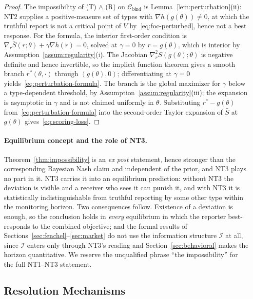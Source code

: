 \documentclass[acmsmall,nonacm,screen]{acmart}
\theoremstyle{acmplain}%
\theoremstyle{acmdefinition}%
\newcommand{\calI}{\mathcal{I}}
\newcommand{\Cbind}{\mathcal{C}_{\mathrm{bind}}}
\newcommand{\Sbar}{\bar{S}}
\numberwithin{equation}{section}
\begin{document}
\begin{proof}
The impossibility of (T) $\wedge$ (R) on $\Cbind$ is Lemma~\ref{lem:perturbation}(ii): NT2 supplies a positive-measure set of types with $\nabla h(g(\theta)) \neq 0$, at which the truthful report is not a critical point of $V$ by~\eqref{eq:foc-perturbed}, hence not a best response. For the formula, the interior first-order condition is $\nabla_r \Sbar(r;\theta) + \gamma \nabla h(r) = 0$, solved at $\gamma = 0$ by $r = g(\theta)$, which is interior by Assumption~\ref{assum:regularity}(i). The Jacobian $\nabla^2_r \Sbar(g(\theta);\theta)$ is negative definite and hence invertible, so the implicit function theorem gives a smooth branch $r^*(\theta,\cdot)$ through $(g(\theta),0)$; differentiating at $\gamma = 0$ yields~\eqref{eq:perturbation-formula}. The branch is the global maximizer for $\gamma$ below a type-dependent threshold, by Assumption~\ref{assum:regularity}(iii); the expansion is asymptotic in $\gamma$ and is not claimed uniformly in $\theta$. Substituting $r^* - g(\theta)$ from~\eqref{eq:perturbation-formula} into the second-order Taylor expansion of $\Sbar$ at $g(\theta)$ gives~\eqref{eq:scoring-loss}.
\end{proof}

\paragraph{Equilibrium concept and the role of NT3.}
Theorem~\ref{thm:impossibility} is an \emph{ex post} statement, hence stronger than the corresponding Bayesian Nash claim and independent of the prior, and NT3 plays no part in it. NT3 carries it into an equilibrium prediction: without NT3 the deviation is visible and a receiver who sees it can punish it, and with NT3 it is statistically indistinguishable from truthful reporting by some other type within the monitoring horizon. Two consequences follow. Existence of a deviation is enough, so the conclusion holds in \emph{every} equilibrium in which the reporter best-responds to the combined objective; and the formal results of Sections~\ref{sec:fenchel}--\ref{sec:market} do not use the information structure $\calI$ at all, since $\calI$ enters only through NT3's reading and Section~\ref{sec:behavioral} makes the horizon quantitative. We reserve the unqualified phrase ``the impossibility'' for the full NT1--NT3 statement.

\subsection{Resolution Mechanisms}\label{sec:resolution}
\end{document}
